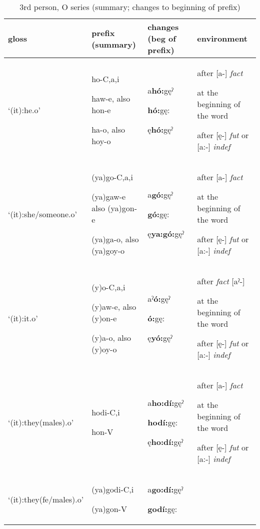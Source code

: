\begin{table}
\caption{3rd person, O series (summary; changes to beginning of prefix)}
\label{tab:1:3ppron}
\tiny{
\begin{tabularx}{\textwidth}{XXXX}
\lsptoprule
gloss & prefix (summary) & changes (beg of prefix) & environment\\
\midrule
‘(it):he.o’ & ho-C,a,i

haw-e, also hon-e

ha-o, also hoy-o & a\textbf{hó:}gęˀ

\textbf{hó:}gę:

ę\textbf{hó:}gęˀ & after [a-] \textit{fact}

at the beginning of the word 

after [ę-] \textit{fut} or [a:-] \textit{indef}\\
‘(it):she/someone.o’ & (ya)go-C,a,i

(ya)gaw-e also (ya)gon-e

(ya)ga-o, also (ya)goy-o & a\textbf{gó:}gęˀ

\textbf{gó:}gę:

ę\textbf{ya:gó:}gęˀ & after [a-] \textit{fact}

at the beginning of the word 

after [ę-] \textit{fut} or [a:-] \textit{indef}\\
‘(it):it.o’ & (y)o-C,a,i

(y)aw-e, also (y)on-e

(y)a-o, also (y)oy-o & aˀ\textbf{ó:}gęˀ

\textbf{ó:}gę:

ę\textbf{yó:}gęˀ & after \textit{fact} [aˀ-] 

at the beginning of the word 

after [ę-] \textit{fut} or [a:-] \textit{indef}\\
‘(it):they(males).o’ & hodi-C,i

hon-V & a\textbf{ho:dí:}gęˀ

\textbf{hodí:}gę:

ę\textbf{ho:dí:}gęˀ & after [a-] \textit{fact}

at the beginning of the word 

after [ę-] \textit{fut} or [a:-] \textit{indef}\\
‘(it):they(fe/males).o’ & (ya)godi-C,i

(ya)gon-V & a\textbf{go:dí:}gęˀ

\textbf{godí:}gę:


\end{tabularx}}
\end{table}
